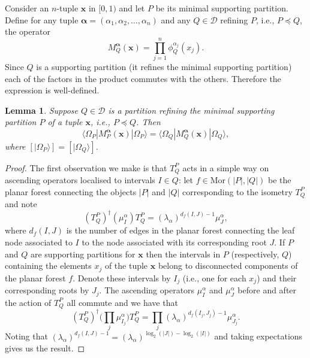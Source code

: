 \documentclass[11pt,oneside]{amsart}
\theoremstyle{plain}%
\newtheorem{lemma}[theorem]{Lemma}
\theoremstyle{definition}
\theoremstyle{remark}
\begin{document}
Consider an $n$-tuple $\mathbf{x}$ in $[0,1)$ and let $P$ be its minimal supporting partition. Define for any tuple $\boldsymbol{\alpha} = (\alpha_1, \alpha_2, \ldots, \alpha_n)$ and any $Q\in\mathcal{D}$ refining $P$, i.e., $P\preceq Q$, the operator
\begin{equation}
	M^{\boldsymbol{\alpha}}_Q(\mathbf{x}) = \prod_{j=1}^n \phi_Q^{\alpha_j}(x_j).
\end{equation}
Since $Q$ is a supporting partition (it refines the minimal supporting partition) each of the factors in the product commutes with the others. Therefore the expression is well-defined.
\begin{lemma}
	Suppose $Q\in\mathcal{D}$ is a partition refining the minimal supporting partition $P$ of a tuple $\mathbf{x}$, i.e., $P\preceq Q$. Then
	\begin{equation}
		\langle \Omega_P|M^{\boldsymbol{\alpha}}_P(\mathbf{x})|\Omega_P\rangle = \langle \Omega_Q|M^{\boldsymbol{\alpha}}_Q(\mathbf{x})|\Omega_Q\rangle,
	\end{equation}
	where $[|\Omega_P\rangle] = [|\Omega_Q\rangle]$.
\end{lemma}
\begin{proof}
	The first observation we make is that $T^P_Q$ acts in a simple way on ascending operators localised to intervals $I\in Q$: let $f\in\text{Mor}(|P|,|Q|)$ be the planar forest connecting the objects $|P|$ and $|Q|$ corresponding to the isometry $T^P_Q$ and note
	\begin{equation}
		(T^P_Q)^\dag(\mu^\alpha_I)T^P_Q = (\lambda_\alpha)^{d_f(I,J)-1}\mu^\alpha_J,
	\end{equation}
	where $d_f(I,J)$ is the number of edges in the planar forest connecting the leaf node associated to $I$ to the node associated with its corresponding root $J$. If $P$ and $Q$ are supporting partitions for $\mathbf{x}$ then the intervals in $P$ (respectively, $Q$) containing the elements $x_j$ of the tuple $\mathbf{x}$ belong to disconnected components of the planar forest $f$.
	Denote these intervals by $I_j$ (i.e., one for each $x_j$) and their corresponding roots by $J_j$.	The ascending operators $\mu_I^\alpha$ and $\mu_J^\alpha$ before and after the action of $T^P_Q$ all commute and we have that
	\begin{equation}
		(T^P_Q)^\dag\biggl(\prod_j\mu^\alpha_{I_j}\biggr)T^P_Q = \prod_j(\lambda_\alpha)^{d_f(I_j,J_j)-1}\mu^\alpha_{J_j}.
	\end{equation}
	Noting that $(\lambda_\alpha)^{d_f(I,J)-1} = (\lambda_\alpha)^{\log_2(|J|)-\log_2(|I|)}$ and taking expectations gives us the result.
\end{proof}
\end{document}
